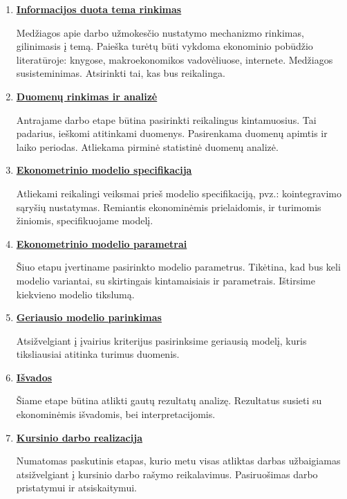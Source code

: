 \documentclass[12pt,a4paper]{article}
\theoremstyle{change}\newtheorem{salyga}{Uždavinys}
\begin{document}
\begin{enumerate}



\item  \underline{\textbf{{Informacijos duota tema rinkimas}}}
\vskip 10pt

Medžiagos apie darbo užmokesčio nustatymo mechanizmo rinkimas, gilinimasis į temą. Paieška turėtų būti vykdoma ekonominio pobūdžio literatūroje: knygose, makroekonomikos vadovėliuose, internete. Medžiagos susisteminimas. Atsirinkti tai, kas bus reikalinga.

\item  \underline{\textbf{{Duomenų rinkimas ir analizė}}}
\vskip 10pt

Antrajame darbo etape būtina pasirinkti reikalingus kintamuosius. Tai padarius, ieškomi atitinkami duomenys. Pasirenkama duomenų apimtis ir laiko periodas. Atliekama pirminė statistinė duomenų analizė. 


\item  \underline{\textbf{{Ekonometrinio modelio specifikacija}}}
\vskip 10pt

Atliekami reikalingi veiksmai prieš modelio specifikaciją, pvz.: kointegravimo sąryšių nustatymas. Remiantis ekonominėmis prielaidomis, ir turimomis žiniomis, specifikuojame modelį. 

\item  \underline{\textbf{{Ekonometrinio modelio parametrai}}}
\vskip 10pt

Šiuo etapu įvertiname pasirinkto modelio parametrus. Tikėtina, kad bus  keli modelio variantai, su skirtingais kintamaisiais ir parametrais. Ištirsime kiekvieno modelio tikslumą. 

\item  \underline{\textbf{{Geriausio modelio parinkimas}}}
\vskip 10pt

Atsižvelgiant į įvairius kriterijus pasirinksime geriausią modelį, kuris tiksliausiai atitinka turimus duomenis. 

\item  \underline{\textbf{{Išvados}}}
\vskip 10pt

Šiame etape būtina atlikti gautų rezultatų analizę. Rezultatus susieti su ekonominėmis išvadomis, bei interpretacijomis.

\item  \underline{\textbf{{Kursinio darbo realizacija}}}
\vskip 10pt

Numatomas paskutinis etapas, kurio metu visas atliktas darbas užbaigiamas atsižvelgiant į kursinio darbo rašymo reikalavimus. Pasiruošimas darbo pristatymui ir atsiskaitymui.


\end{enumerate}



     
     
\end{document}
